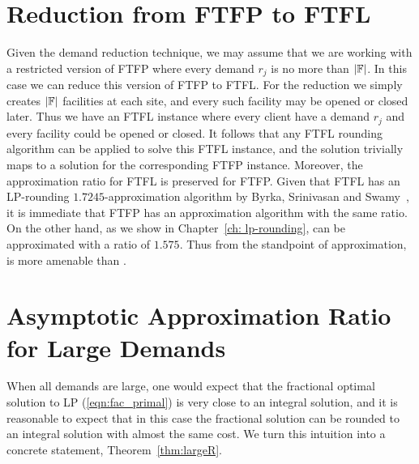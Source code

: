 \documentclass[oneside,final]{ucr}
\begin{document}
\section{Reduction from FTFP to FTFL}
\label{sec: reduction_to_ftfl}
Given the demand reduction technique, we may assume that we
are working with a restricted version of FTFP where every
demand $r_j$ is no more than $|\mathbb{F}|$. In this case we
can reduce this version of FTFP to FTFL. For the reduction
we simply creates $|\mathbb{F}|$ facilities at each site, and
every such facility may be opened or closed later. Thus we
have an FTFL instance where every client have a demand $r_j$
and every facility could be opened or closed. It follows
that any FTFL rounding algorithm can be applied to solve
this FTFL instance, and the solution trivially maps to a
solution for the corresponding FTFP instance. Moreover, the
approximation ratio for FTFL is preserved for FTFP. Given
that FTFL has an LP-rounding $1.7245$-approximation
algorithm by Byrka, Srinivasan and Swamy~\cite{ByrkaSS10},
it is immediate that FTFP has an approximation algorithm
with the same ratio. On the other hand, as we show in
Chapter~\ref{ch: lp-rounding}, {\FTFP} can be approximated
with a ratio of $1.575$. Thus from the standpoint of
approximation, {\FTFP} is more amenable than {\FTFL}.

\section{Asymptotic Approximation Ratio for Large
  Demands}
\label{sec: large_demands}
When all demands are large, one would expect that the
fractional optimal solution to LP (\ref{eqn:fac_primal}) is
very close to an integral solution, and it is reasonable to
expect that in this case the fractional solution can be
rounded to an integral solution with almost the same
cost. We turn this intuition into a concrete statement,
Theorem~\ref{thm:largeR}.
\end{document}

